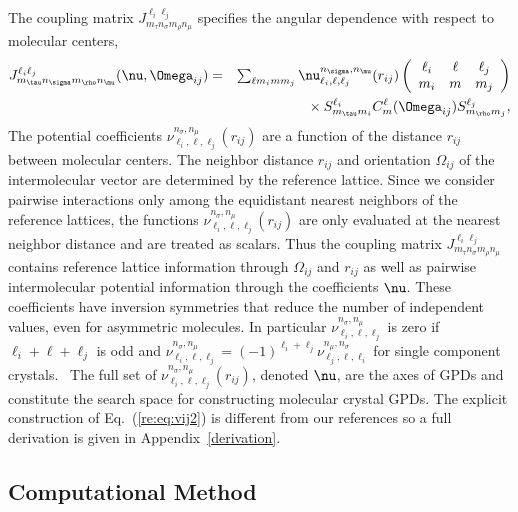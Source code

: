 \documentclass[preprint]{iucr}              %
\newcommand{\mb}[1]{\ensuremath{\mbox{\boldmath $ #1 $}}}
\begin{document}
The coupling matrix $J_{m_\tau n_\sigma m_\rho n_\mu}^{\ell_i
\ell_j}$ specifies the angular dependence with respect to molecular
centers,
\begin{eqnarray}
\label{coupling} J_{m_\tau n_\sigma m_\rho n_\mu}^{\ell_i
\ell_j}(\mb{\nu},\mb{\Omega}_{ij})&=&\sum_{\ell m_i m m_j}
\nu_{\ell_i,\ell,\ell_j}^{n_\sigma,n_\mu}(r_{ij})\left(\begin{array}{ccc}
 \ell_i & \ell & \ell_j \\ m_i & m & m_j
\end{array}\right)\nonumber\\
&&{}\times S^{\ell_i}_{m_\tau m_i}C_{m}^{\ell}(\mb{\Omega}_{ij})
S^{\ell_j}_{m_\rho m_j},
\end{eqnarray}
The potential coefficients
$\nu_{\ell_i,\ell,\ell_j}^{n_\sigma,n_\mu}(r_{ij})$ are a function
of the distance $r_{ij}$ between molecular centers. The neighbor
distance $r_{ij}$ and orientation $\Omega_{ij}$ of the
intermolecular vector are determined by the reference lattice. Since
we consider pairwise interactions only among the equidistant nearest
neighbors of the reference lattices, the functions
$\nu_{\ell_i,\ell,\ell_j}^{n_\sigma,n_\mu}(r_{ij})$ are only
evaluated at the nearest neighbor distance and are treated as
scalars. Thus the coupling matrix $J_{m_\tau n_\sigma m_\rho
n_\mu}^{\ell_i \ell_j}$ contains reference lattice information
through $\Omega_{ij}$ and $r_{ij}$ as well as pairwise
intermolecular potential information through the coefficients
$\mb{\nu}$. These coefficients have inversion symmetries that reduce
the number of independent values, even for asymmetric molecules.  In
particular $\nu_{\ell_i,\ell,\ell_j}^{n_\sigma,n_\mu}$ is zero if
$\ell_i+\ell+\ell_j$ is odd and
$\nu_{\ell_i,\ell,\ell_j}^{n_\sigma,n_\mu}=
(-1)^{\ell_i+\ell_j}\nu_{\ell_j,\ell,\ell_i}^{n_\mu,n_\sigma}$ for
single component crystals.~\cite{Avoird80} The full set of
$\nu_{\ell_i,\ell,\ell_j}^{n_\sigma,n_\mu}(r_{ij})$, denoted
$\mb{\nu}$, are the axes of GPDs and constitute the search space for
constructing molecular crystal GPDs.  The explicit construction of Eq.~(\ref{re:eq:vij2}) is
different from our references so a full derivation is given in Appendix~\ref{derivation}.

\subsection{Computational Method}
\label{Computational_Strategy}
\end{document}
